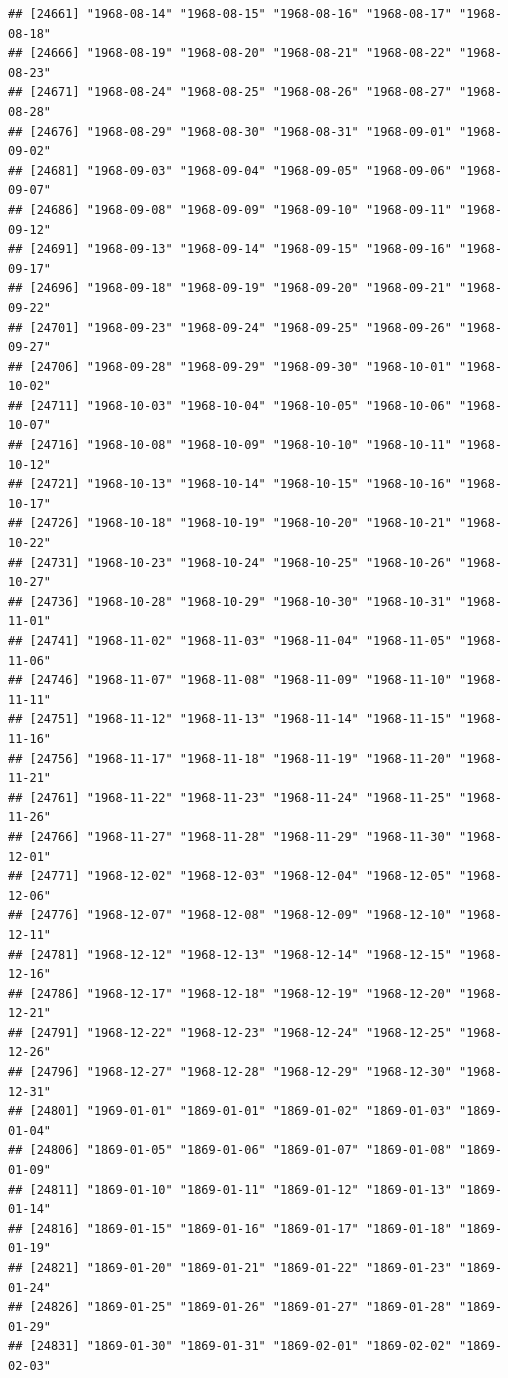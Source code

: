 \documentclass{article}\usepackage[]{graphicx}\usepackage[]{color}
\makeatletter
\newenvironment{kframe}{%
 \def\at@end@of@kframe{}%
 \ifinner\ifhmode%
  \def\at@end@of@kframe{\end{minipage}}%
  \begin{minipage}{\columnwidth}%
 \fi\fi%
 \def\FrameCommand##1{\hskip\@totalleftmargin \hskip-\fboxsep
 \colorbox{shadecolor}{##1}\hskip-\fboxsep
     \hskip-\linewidth \hskip-\@totalleftmargin \hskip\columnwidth}%
 \MakeFramed {\advance\hsize-\width
   \@totalleftmargin\z@ \linewidth\hsize
   \@setminipage}}%
 {\par\unskip\endMakeFramed%
 \at@end@of@kframe}
\newenvironment{knitrout}{}{} %
\makeatother
\begin{document}
\begin{description}
\begin{knitrout}
\begin{kframe}
\begin{verbatim}
## [24661] "1968-08-14" "1968-08-15" "1968-08-16" "1968-08-17" "1968-08-18"
## [24666] "1968-08-19" "1968-08-20" "1968-08-21" "1968-08-22" "1968-08-23"
## [24671] "1968-08-24" "1968-08-25" "1968-08-26" "1968-08-27" "1968-08-28"
## [24676] "1968-08-29" "1968-08-30" "1968-08-31" "1968-09-01" "1968-09-02"
## [24681] "1968-09-03" "1968-09-04" "1968-09-05" "1968-09-06" "1968-09-07"
## [24686] "1968-09-08" "1968-09-09" "1968-09-10" "1968-09-11" "1968-09-12"
## [24691] "1968-09-13" "1968-09-14" "1968-09-15" "1968-09-16" "1968-09-17"
## [24696] "1968-09-18" "1968-09-19" "1968-09-20" "1968-09-21" "1968-09-22"
## [24701] "1968-09-23" "1968-09-24" "1968-09-25" "1968-09-26" "1968-09-27"
## [24706] "1968-09-28" "1968-09-29" "1968-09-30" "1968-10-01" "1968-10-02"
## [24711] "1968-10-03" "1968-10-04" "1968-10-05" "1968-10-06" "1968-10-07"
## [24716] "1968-10-08" "1968-10-09" "1968-10-10" "1968-10-11" "1968-10-12"
## [24721] "1968-10-13" "1968-10-14" "1968-10-15" "1968-10-16" "1968-10-17"
## [24726] "1968-10-18" "1968-10-19" "1968-10-20" "1968-10-21" "1968-10-22"
## [24731] "1968-10-23" "1968-10-24" "1968-10-25" "1968-10-26" "1968-10-27"
## [24736] "1968-10-28" "1968-10-29" "1968-10-30" "1968-10-31" "1968-11-01"
## [24741] "1968-11-02" "1968-11-03" "1968-11-04" "1968-11-05" "1968-11-06"
## [24746] "1968-11-07" "1968-11-08" "1968-11-09" "1968-11-10" "1968-11-11"
## [24751] "1968-11-12" "1968-11-13" "1968-11-14" "1968-11-15" "1968-11-16"
## [24756] "1968-11-17" "1968-11-18" "1968-11-19" "1968-11-20" "1968-11-21"
## [24761] "1968-11-22" "1968-11-23" "1968-11-24" "1968-11-25" "1968-11-26"
## [24766] "1968-11-27" "1968-11-28" "1968-11-29" "1968-11-30" "1968-12-01"
## [24771] "1968-12-02" "1968-12-03" "1968-12-04" "1968-12-05" "1968-12-06"
## [24776] "1968-12-07" "1968-12-08" "1968-12-09" "1968-12-10" "1968-12-11"
## [24781] "1968-12-12" "1968-12-13" "1968-12-14" "1968-12-15" "1968-12-16"
## [24786] "1968-12-17" "1968-12-18" "1968-12-19" "1968-12-20" "1968-12-21"
## [24791] "1968-12-22" "1968-12-23" "1968-12-24" "1968-12-25" "1968-12-26"
## [24796] "1968-12-27" "1968-12-28" "1968-12-29" "1968-12-30" "1968-12-31"
## [24801] "1969-01-01" "1869-01-01" "1869-01-02" "1869-01-03" "1869-01-04"
## [24806] "1869-01-05" "1869-01-06" "1869-01-07" "1869-01-08" "1869-01-09"
## [24811] "1869-01-10" "1869-01-11" "1869-01-12" "1869-01-13" "1869-01-14"
## [24816] "1869-01-15" "1869-01-16" "1869-01-17" "1869-01-18" "1869-01-19"
## [24821] "1869-01-20" "1869-01-21" "1869-01-22" "1869-01-23" "1869-01-24"
## [24826] "1869-01-25" "1869-01-26" "1869-01-27" "1869-01-28" "1869-01-29"
## [24831] "1869-01-30" "1869-01-31" "1869-02-01" "1869-02-02" "1869-02-03"

\end{verbatim}
\end{kframe}
\end{knitrout}
\end{description}
\end{document}
